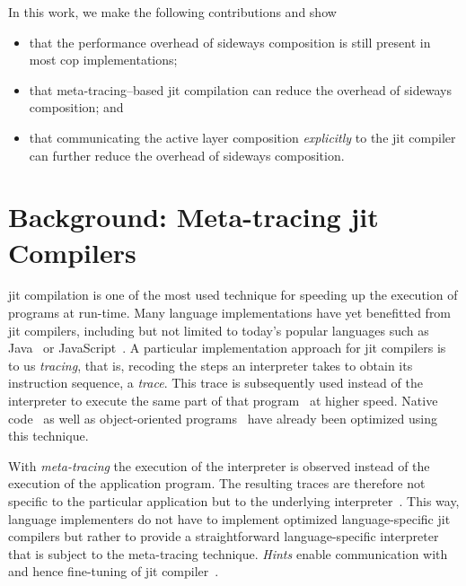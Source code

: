\documentclass[preprint,english,10pt,nonatbib]{sigplanconf}
\begin{document}

In this work, we make the following contributions and show
\begin{itemize}
\item that the performance overhead of sideways composition is still
  present in most \ac{cop} implementations;
\item that meta-tracing--based \ac{jit} compilation can reduce the
  overhead of sideways composition; and
\item that communicating the active layer composition \emph{explicitly} to the
  \ac{jit} compiler can further reduce the overhead of sideways composition.
\end{itemize}


\section{Background: Meta-tracing \acs{jit} Compilers}

\Acf{jit} compilation is one of the most used technique for speeding up the
execution of programs at run-time. Many language implementations have yet
benefitted from \ac{jit} compilers, including but not limited to today's
popular languages such as Java~\cite{paleczny+:2001:java-hotspot} or
JavaScript~\cite{holtta:2013:crankshafting-from}. A particular implementation
approach for \ac{jit} compilers is to us \emph{tracing}, that is, recoding the
steps an interpreter takes to obtain its instruction sequence, a \emph{trace}.
This trace is subsequently used instead of the interpreter to execute the same
part of that program~\cite{mitchell:1970:design-construction} at higher speed.
Native code~\cite{bala+:2000:dynamo:-transparent} as well as object-oriented
programs~\cite{gal+:2006:hotpathvm:-effective} have already been optimized
using this technique.

With \emph{meta-tracing} the execution of the interpreter is observed instead
of the execution of the application program. The resulting traces are therefore
not specific to the particular application but to the underlying
interpreter~\cite{bolz+:2009:tracing-meta-level:}. This way, language
implementers do not have to implement optimized language-specific \ac{jit}
compilers but rather to provide a straightforward language-specific interpreter
that is subject to the meta-tracing technique. \emph{Hints} enable
communication with and hence fine-tuning of \ac{jit}
compiler~\cite{bolz_runtime_2011}.
\end{document}

